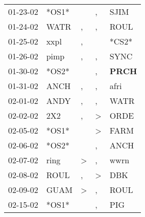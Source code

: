 \begin{supertabular}{p{0.07\textwidth}p{0.06\textwidth}p{0.02\textwidth}p{0.02\textwidth}p{0.06\textwidth}}
          01-23-02\textsuperscript{} &                            *OS1* &                  &                , &           SJIM\textsuperscript{} \\
          01-24-02\textsuperscript{} &           WATR\textsuperscript{} &                , &                , &           ROUL\textsuperscript{} \\
          01-25-02\textsuperscript{} &           xxpl\textsuperscript{} &                , &                  &                            *CS2* \\
          01-26-02\textsuperscript{} &           pimp\textsuperscript{} &                , &                , &           SYNC\textsuperscript{} \\
          01-30-02\textsuperscript{} &                            *OS2* &                  &                , &  \textbf{PRCH\textsuperscript{}} \\
          01-31-02\textsuperscript{} &           ANCH\textsuperscript{} &                , &                , &           afri\textsuperscript{} \\
          02-01-02\textsuperscript{} &           ANDY\textsuperscript{} &                , &                , &           WATR\textsuperscript{} \\
          02-02-02\textsuperscript{} &            2X2\textsuperscript{} &                , &     \textgreater &           ORDE\textsuperscript{} \\
          02-05-02\textsuperscript{} &                            *OS1* &                  &     \textgreater &           FARM\textsuperscript{} \\
          02-06-02\textsuperscript{} &                            *OS2* &                  &                , &           ANCH\textsuperscript{} \\
          02-07-02\textsuperscript{} &           ring\textsuperscript{} &     \textgreater &                , &           wwrn\textsuperscript{} \\
          02-08-02\textsuperscript{} &           ROUL\textsuperscript{} &                , &     \textgreater &            DBK\textsuperscript{} \\
          02-09-02\textsuperscript{} &           GUAM\textsuperscript{} &     \textgreater &                , &           ROUL\textsuperscript{} \\
          02-15-02\textsuperscript{} &                            *OS1* &                  &                , &            PIG\textsuperscript{} \\

\end{supertabular}
